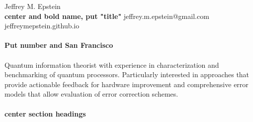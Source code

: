 \documentclass[]{article}
\begin{document}
\noindent \large Jeffrey M. Epstein\vspace{5pt}\hfill\small\\
\textbf{\color{red} center and bold name, put "title"}
jeffrey.m.epstein@gmail.com\\
jeffreymepstein.github.io\\
\\

\textbf{\color{red}Put number and San Francisco}\\
\\
Quantum information theorist with experience in characterization and benchmarking of quantum processors. Particularly interested in approaches that provide actionable feedback for hardware improvement and comprehensive error models that allow evaluation of error correction schemes.\\
\\
\textbf{\color{red}center section headings}
\end{document}
